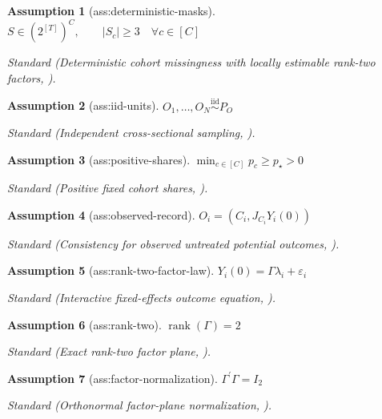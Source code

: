 \documentclass{article}
\newtheorem{assumption}{Assumption}
\begin{document}
\begin{assumption}[ass:deterministic-masks]\label{ass:deterministic-masks}
\(S\in(2^{[T]})^C,\qquad |S_c|\ge3\quad\forall c\in[C]\)
\par\smallskip\noindent\emph{Standard} (Deterministic cohort missingness with locally estimable rank-two factors, \cite{LeiRoss2023}).
\end{assumption}

\begin{assumption}[ass:iid-units]\label{ass:iid-units}
\(O_1,\ldots,O_N\stackrel{\mathrm{iid}}{\sim}P_O\)
\par\smallskip\noindent\emph{Standard} (Independent cross-sectional sampling, \cite{LeiRoss2023}).
\end{assumption}

\begin{assumption}[ass:positive-shares]\label{ass:positive-shares}
\(\min_{c\in[C]}p_c\ge p_{\star}>0\)
\par\smallskip\noindent\emph{Standard} (Positive fixed cohort shares, \cite{LeiRoss2023}).
\end{assumption}

\begin{assumption}[ass:observed-record]\label{ass:observed-record}
\(O_i=(C_i,J_{C_i}Y_i(0))\)
\par\smallskip\noindent\emph{Standard} (Consistency for observed untreated potential outcomes, \cite{LeiRoss2023}).
\end{assumption}

\begin{assumption}[ass:rank-two-factor-law]\label{ass:rank-two-factor-law}
\(Y_i(0)=\Gamma\lambda_i+\varepsilon_i\)
\par\smallskip\noindent\emph{Standard} (Interactive fixed-effects outcome equation, \cite{LeiRoss2023}).
\end{assumption}

\begin{assumption}[ass:rank-two]\label{ass:rank-two}
\(\operatorname{rank}(\Gamma)=2\)
\par\smallskip\noindent\emph{Standard} (Exact rank-two factor plane, \cite{LeiRoss2023}).
\end{assumption}

\begin{assumption}[ass:factor-normalization]\label{ass:factor-normalization}
\(\Gamma^{\prime}\Gamma=I_2\)
\par\smallskip\noindent\emph{Standard} (Orthonormal factor-plane normalization, \cite{LeiRoss2023}).
\end{assumption}
\end{document}
